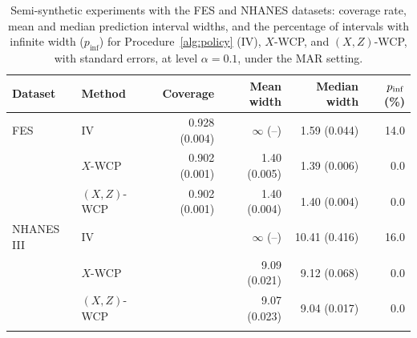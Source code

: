 \begin{table}[!htbp]
\centering\small
\setlength{\tabcolsep}{3pt}
\begin{tabular}{llrrrr}
\toprule
Dataset & Method & Coverage & Mean width & Median width & $p_{\rm inf}$ (\%) \\
\midrule
FES & IV
& \cellcolor{green!20}0.928 (0.004)
& $\infty$ (--)
& 1.59 (0.044)
& 14.0 \\
 & $X$-WCP
& \cellcolor{green!20}0.902 (0.001)
& 1.40 (0.005)
& 1.39 (0.006)
& 0.0 \\
 & $(X,Z)$-WCP
& \cellcolor{green!20}0.902 (0.001)
& 1.40 (0.004)
& 1.40 (0.004)
& 0.0 \\
\addlinespace
{NHANES III} & {IV}
& \cellcolor{green!20}{0.931 (0.004)}
& {$\infty$ (--)}
& {10.41 (0.416)}
& {16.0} \\
 & {$X$-WCP}
& \cellcolor{green!20}{0.904 (0.001)}
& {9.09 (0.021)}
& {9.12 (0.068)}
& {0.0} \\
 & {$(X,Z)$-WCP}
& \cellcolor{green!20}{0.905 (0.001)}
& {9.07 (0.023)}
& {9.04 (0.017)}
& {0.0} \\
\addlinespace
\bottomrule
\end{tabular}
\caption{Semi-synthetic experiments with the FES and NHANES datasets: coverage rate, mean and median prediction interval widths, and the percentage of intervals with infinite width ($p_{\text{inf}}$) for Procedure~\ref{alg:policy} (IV), $X$-WCP, and $(X,Z)$-WCP, with standard errors, at level $\alpha=0.1$, under the MAR setting.}
\label{tab:empirical-mar}
\end{table}
